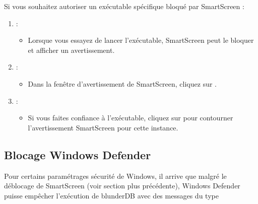 \documentclass[letterpaper,10pt,french]{sphinxmanual}
\begin{document}
\sphinxAtStartPar
Si vous souhaitez autoriser un exécutable spécifique bloqué par SmartScreen :
\begin{enumerate}
%
\item {} 
\sphinxAtStartPar
{} :
\begin{itemize}
\item {} 
\sphinxAtStartPar
Lorsque vous essayez de lancer l’exécutable, SmartScreen peut le bloquer
et afficher un avertissement.

\end{itemize}

\item {} 
\sphinxAtStartPar
{} :
\begin{itemize}
\item {} 
\sphinxAtStartPar
Dans la fenêtre d’avertissement de SmartScreen, cliquez sur .

\end{itemize}

\item {} 
\sphinxAtStartPar
{} :
\begin{itemize}
\item {} 
\sphinxAtStartPar
Si vous faites confiance à l’exécutable, cliquez sur  pour contourner l’avertissement SmartScreen pour cette instance.

\end{itemize}

\end{enumerate}


\subsection{Blocage Windows Defender}
\label{\detokenize{annexe_windows_securite:blocage-windows-defender}}
\sphinxAtStartPar
Pour certains paramétrages sécurité de Windows, il arrive que malgré le
déblocage de SmartScreen (voir section plus précédente), Windows Defender
puisse empêcher l’exécution de blunderDB avec des messages du type

\begin{figure}[htbp]
\centering

\noindent{}
\end{figure}
\end{document}
